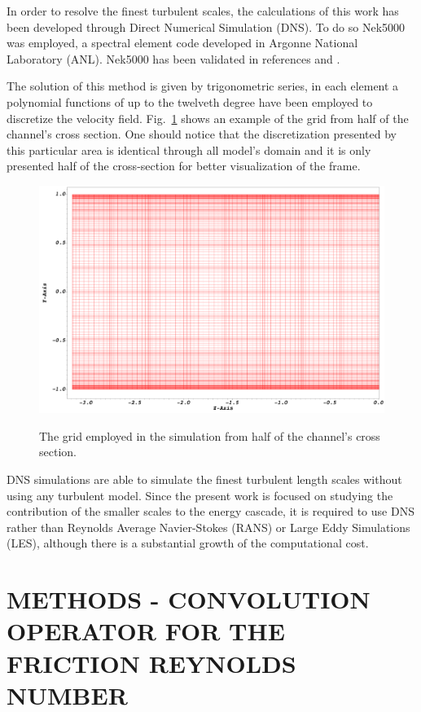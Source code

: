 \documentclass[twocolumn,10pt]{asme2e}
\begin{document}
In order to resolve the finest turbulent scales, the calculations of this work has been developed through Direct Numerical Simulation (DNS). To do so Nek5000 was employed, a spectral element code developed in Argonne National Laboratory (ANL). Nek5000 has been validated in references \cite{merzari2013} and \cite{Obabko2011}.

The solution of this method is given by trigonometric series, in each element a polynomial functions of up to the twelveth degree have been employed to discretize the velocity field. Fig.~\ref{fig:mesh} shows an example of the grid from half of the channel's cross section. One should notice that the discretization presented by this particular area is identical through all model's domain and it is only presented half of the cross-section for better visualization of the frame.

\begin{figure}[!htbp]
	\centering
	\scalebox{0.16}
	{\includegraphics{mesh.png}}
	\caption{The grid employed in the simulation from half of the channel's cross section.}
	\label{fig:mesh}
\end{figure}

DNS simulations are able to simulate the finest turbulent length scales without using any turbulent model. Since the present work is focused on studying the contribution of the smaller scales to the energy cascade, it is required to use DNS rather than Reynolds Average Navier-Stokes (RANS) or Large Eddy Simulations (LES), although there is a substantial growth of the computational cost.

\section*{METHODS - CONVOLUTION OPERATOR FOR THE FRICTION REYNOLDS NUMBER}
\end{document}
